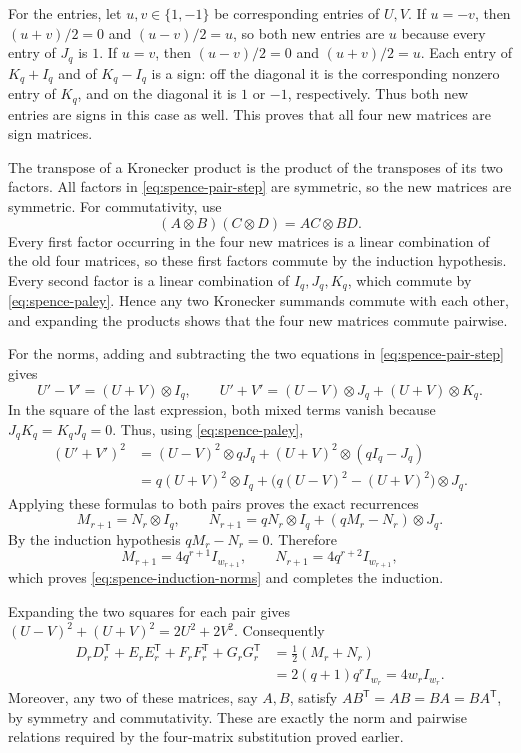 \documentclass[10pt]{article}
\begin{document}
For the entries, let $u,v\in\{1,-1\}$ be corresponding entries of $U,V$.
If $u=-v$, then $(u+v)/2=0$ and $(u-v)/2=u$, so both new entries are $u$
because every entry of $J_q$ is $1$. If $u=v$, then $(u-v)/2=0$ and
$(u+v)/2=u$. Each entry of $K_q+I_q$ and of $K_q-I_q$ is a sign: off
the diagonal it is the corresponding nonzero entry of $K_q$, and on the
diagonal it is $1$ or $-1$, respectively. Thus both new entries are signs
in this case as well. This proves that all four new matrices are sign
matrices.

The transpose of a Kronecker product is the product of the transposes of
its two factors. All factors in \eqref{eq:spence-pair-step} are symmetric,
so the new matrices are symmetric. For commutativity, use
\[
 (A\otimes B)(C\otimes D)=AC\otimes BD.
\]
Every first factor occurring in the four new matrices is a linear
combination of the old four matrices, so these first factors commute by
the induction hypothesis. Every second factor is a linear combination of
$I_q,J_q,K_q$, which commute by \eqref{eq:spence-paley}. Hence any two
Kronecker summands commute with each other, and expanding the products
shows that the four new matrices commute pairwise.

For the norms, adding and subtracting the two equations in
\eqref{eq:spence-pair-step} gives
\[
 U'-V'=(U+V)\otimes I_q,\qquad
 U'+V'=(U-V)\otimes J_q+(U+V)\otimes K_q.
\]
In the square of the last expression, both mixed terms vanish because
$J_qK_q=K_qJ_q=0$. Thus, using \eqref{eq:spence-paley},
\[
 \begin{split}
 (U'+V')^2
 &=(U-V)^2\otimes qJ_q+(U+V)^2\otimes(qI_q-J_q)\\
 &=q(U+V)^2\otimes I_q+
       \bigl(q(U-V)^2-(U+V)^2\bigr)\otimes J_q.
 \end{split}
\]
Applying these formulas to both pairs proves the exact recurrences
\[
 M_{r+1}=N_r\otimes I_q,\qquad
 N_{r+1}=qN_r\otimes I_q+(qM_r-N_r)\otimes J_q.
\]
By the induction hypothesis $qM_r-N_r=0$. Therefore
\[
 M_{r+1}=4q^{r+1}I_{w_{r+1}},\qquad
 N_{r+1}=4q^{r+2}I_{w_{r+1}},
\]
which proves \eqref{eq:spence-induction-norms} and completes the induction.

Expanding the two squares for each pair gives
$(U-V)^2+(U+V)^2=2U^2+2V^2$. Consequently
\begin{equation}\label{eq:spence-total-norm}
 \begin{split}
 D_rD_r^{\mathsf T}+E_rE_r^{\mathsf T}
   +F_rF_r^{\mathsf T}+G_rG_r^{\mathsf T}
 &=\tfrac12(M_r+N_r)\\
 &=2(q+1)q^rI_{w_r}=4w_rI_{w_r}.
 \end{split}
\end{equation}
Moreover, any two of these matrices, say $A,B$, satisfy
$AB^{\mathsf T}=AB=BA=BA^{\mathsf T}$, by symmetry and commutativity.
These are exactly the norm and pairwise relations required by the
four-matrix substitution proved earlier.
\end{document}
